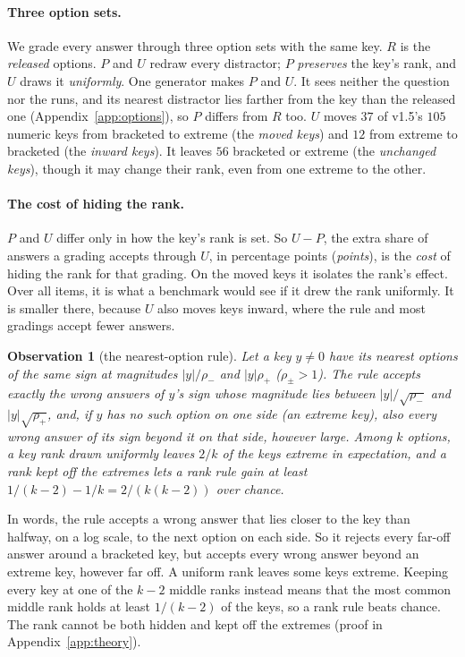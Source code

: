 \documentclass{article}
\newtheorem{observation}{Observation}
\begin{document}
\paragraph{Three option sets.} We grade every answer through three option sets with the same key. $R$ is the
\emph{released} options. $P$ and $U$ redraw every distractor; $P$ \emph{preserves} the key's rank, and $U$ draws it
\emph{uniformly}. One generator makes $P$ and $U$. It sees neither the question
nor the runs, and its nearest distractor lies farther from the key than the released one
(Appendix~\ref{app:options}), so $P$ differs from $R$ too. $U$ moves $37$ of v1.5's $105$ numeric keys from bracketed
to extreme (the \emph{moved keys}) and $12$ from extreme to bracketed (the \emph{inward keys}). It leaves $56$
bracketed or extreme (the \emph{unchanged keys}), though it may change their rank, even from one extreme to the other.

\paragraph{The cost of hiding the rank.} $P$ and $U$ differ only in how the key's rank is set. So $U-P$, the extra
share of answers a grading accepts through $U$, in percentage points (\emph{points}), is the \emph{cost} of hiding the
rank for that grading. On the moved keys it isolates the rank's effect. Over all items, it is what a
benchmark would see if it drew the rank uniformly. It is smaller there, because $U$ also moves keys inward, where the
rule and most gradings accept fewer answers.

\begin{observation}[the nearest-option rule]
\label{obs:bracket}
Let a key $y\neq0$ have its nearest options of the same sign at magnitudes $|y|/\rho_-$ and $|y|\rho_+$
($\rho_\pm>1$). The rule accepts exactly the wrong answers of $y$'s sign whose magnitude lies between
$|y|/\sqrt{\rho_-}$ and $|y|\sqrt{\rho_+}$, and, if $y$ has no such option on one side (an extreme key), also every
wrong answer of its sign beyond it on that side, however large. Among $k$ options, a key rank drawn uniformly leaves
$2/k$ of the keys extreme in expectation, and a rank kept off the extremes lets a rank rule gain at least
$1/(k-2)-1/k=2/(k(k-2))$ over chance.
\end{observation}

In words, the rule accepts a wrong answer that lies closer to the key than halfway, on a log scale, to the next option
on each side. So it rejects every far-off answer around a bracketed key, but accepts every wrong answer beyond an
extreme key, however far off. A uniform rank leaves some keys extreme. Keeping every key at one of the $k-2$ middle
ranks instead means that the most common middle rank holds at least $1/(k-2)$ of the keys, so a rank rule beats
chance. The rank cannot be both hidden and kept off the extremes (proof in Appendix~\ref{app:theory}).
\end{document}
